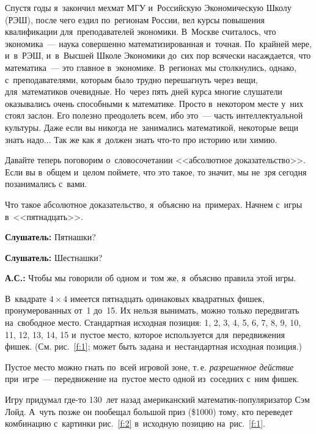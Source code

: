 Спустя годы я~закончил мехмат МГУ и~Российскую Экономическую Школу (РЭШ), после чего ездил
по~регионам России, вел курсы повышения квалификации для~преподавателей экономики. В~Москве
считалось, что экономика~--- наука совершенно математизированная и~точная. По~крайней мере, и~в~РЭШ,
и~в~Высшей Школе Экономики до~сих пор всячески насаждается, что математика~--- это главное
в~экономике. В~регионах мы столкнулись, однако, с~преподавателями, которым было трудно перешагнуть через
вещи, для~математиков очевидные. Но~через пять дней курса многие слушатели оказывались очень
способными к математике.
Просто в~некотором месте у~них стоял заслон. Его полезно преодолеть всем, ибо
это~--- часть интеллектуальной культуры. Даже если вы никогда не~занимались математикой, некоторые
вещи знать надо... Так же как я~должен знать что-то про историю или химию.

Давайте теперь поговорим о~словосочетании <<абсолютное доказательство>>. Если вы в~общем и~целом
поймете, что это такое, то значит, мы не~зря сегодня позанимались с~вами.

Что такое абсолютное доказательство, я~объясню на~примерах. Начнем с~игры в~<<пятнадцать>>.

\textbf{Слушатель:} Пятнашки?

\textbf{Слушатель:} Шестнашки?

\textbf{А.С.:} Чтобы мы говорили об одном и~том же, я~объясню правила этой игры.

В~квадрате $4\times4$ имеется пятнадцать одинаковых квадратных фишек, пронумерованных от~1 до~15. Их
нельзя вынимать, можно только передвигать на~свободное место. Стандартная исходная позиция: 1, 2,
3, 4, 5, 6, 7, 8, 9, 10, 11, 12, 13, 14, 15 и~пустое место, которое используется для~передвижения
фишек. (См. рис.~\ref{f:1}; может быть задана и~нестандартная исходная позиция.)



Пустое место можно гнать по~всей игровой зоне, т.\,е. \textit{разрешенное действие} при~игре~--- передвижение
на~пустое место одной из~соседних с~ним фишек.

Игру придумал где-то 130~лет назад американский математик-популяризатор Сэм Лойд.\vadjust{\pagebreak} А~чуть позже он
пообещал большой приз (\$1000) тому, кто переведет комбинацию с~картинки рис.~\ref{f:2} в~исходную позицию
на~рис.~\ref{f:1}.


